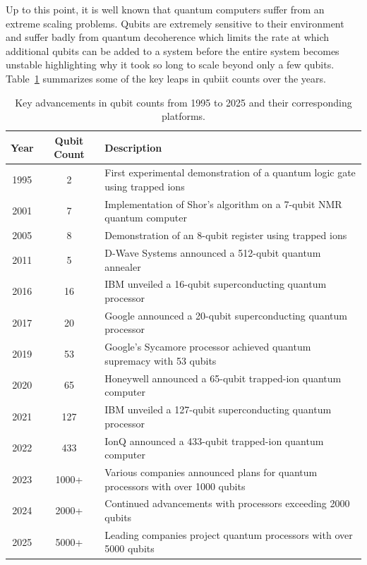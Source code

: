 \documentclass{elbioimp2}
\begin{document}
Up to this point, it is well known that quantum computers suffer from an extreme scaling problems. Qubits are extremely sensitive to their environment
and suffer badly from quantum decoherence which limits the rate at which additional qubits can be added to a system before the entire system becomes unstable
highlighting why it took so long to scale beyond only a few qubits. Table~\ref{tab:qubit_counts} summarizes some of the key leaps in qubiit counts over the years.

\begin{table}[b]
\centering
\begin{tabular}{|c|c|l|}
\hline
\textbf{Year} & \textbf{Qubit Count} & \textbf{Description} \\
\hline
1995 & 2 & First experimental demonstration of a quantum logic gate using trapped ions\cite{Monroe1995} \\
\hline
2001 & 7 & Implementation of Shor's algorithm on a 7-qubit NMR quantum computer\cite{Vandersypen2001} \\
\hline
2005 & 8 & Demonstration of an 8-qubit register using trapped ions\cite{https://www.nature.com/articles/nature04279} \\
\hline
2011 & 5 & D-Wave Systems announced a 512-qubit quantum annealer\cite{DWave2011} \\
\hline
2016 & 16 & IBM unveiled a 16-qubit superconducting quantum processor\cite{IBM2016} \\
\hline
2017 & 20 & Google announced a 20-qubit superconducting quantum processor\cite{Google2017} \\
\hline
2019 & 53 & Google's Sycamore processor achieved quantum supremacy with 53 qubits\cite{Arute2019} \\
\hline
2020 & 65 & Honeywell announced a 65-qubit trapped-ion quantum computer\cite{Honeywell2020} \\
\hline
2021 & 127 & IBM unveiled a 127-qubit superconducting quantum processor\cite{IBM2021} \\
\hline
2022 & 433 & IonQ announced a 433-qubit trapped-ion quantum computer\cite{IonQ2022} \\
\hline
2023 & 1000+ & Various companies announced plans for quantum processors with over 1000 qubits\cite{Various2023} \\
\hline
2024 & 2000+ & Continued advancements with processors exceeding 2000 qubits\cite{Various2024} \\
\hline
2025 & 5000+ & Leading companies project quantum processors with over 5000 qubits\cite{Various2025} \\
\hline
\end{tabular}
\caption{Key advancements in qubit counts from 1995 to 2025 and their corresponding platforms.}\label{tab:qubit_counts}
\end{table}
\end{document}

